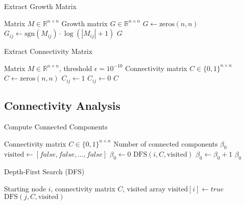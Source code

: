 \documentclass[11pt,a4paper]{article}
\theoremstyle{definition}
\theoremstyle{remark}
\newcommand{\R}{\mathbb{R}}
\newcommand{\abs}[1]{\left|#1\right|}
\newcommand{\sgn}{\text{sgn}}
\begin{document}
\begin{algorithm}
\caption{Extract Growth Matrix}\label{alg:growth}
\begin{algorithmic}[1]
\Require Matrix $M \in \R^{n \times n}$
\Ensure Growth matrix $G \in \R^{n \times n}$
\State $G \gets \text{zeros}(n, n)$
    \State $G_{ij} \gets \sgn(M_{ij}) \cdot \log(\abs{M_{ij}} + 1)$
  \EndFor
\EndFor
\State \Return $G$
\end{algorithmic}
\end{algorithm}

\begin{algorithm}
\caption{Extract Connectivity Matrix}\label{alg:connectivity}
\begin{algorithmic}[1]
\Require Matrix $M \in \R^{n \times n}$, threshold $\epsilon = 10^{-10}$
\Ensure Connectivity matrix $C \in \{0,1\}^{n \times n}$
\State $C \gets \text{zeros}(n, n)$
    \If{$\abs{M_{ij}} > \epsilon$}
      \State $C_{ij} \gets 1$
    \Else
      \State $C_{ij} \gets 0$
    \EndIf
  \EndFor
\EndFor
\State \Return $C$
\end{algorithmic}
\end{algorithm}

\subsection{Connectivity Analysis}

\begin{algorithm}
\caption{Compute Connected Components}\label{alg:components}
\begin{algorithmic}[1]
\Require Connectivity matrix $C \in \{0,1\}^{n \times n}$
\Ensure Number of connected components $\beta_0$
\State $\text{visited} \gets [false, false, \ldots, false]$ 
\State $\beta_0 \gets 0$
    \State $\text{DFS}(i, C, \text{visited})$ 
    \State $\beta_0 \gets \beta_0 + 1$
  \EndIf
\EndFor
\State \Return $\beta_0$
\end{algorithmic}
\end{algorithm}

\begin{algorithm}
\caption{Depth-First Search (DFS)}\label{alg:dfs}
\begin{algorithmic}[1]
\Require Starting node $i$, connectivity matrix $C$, visited array
\State $\text{visited}[i] \gets true$
    \State $\text{DFS}(j, C, \text{visited})$
  \EndIf
\EndFor
\end{algorithmic}
\end{algorithm}
\end{document}
